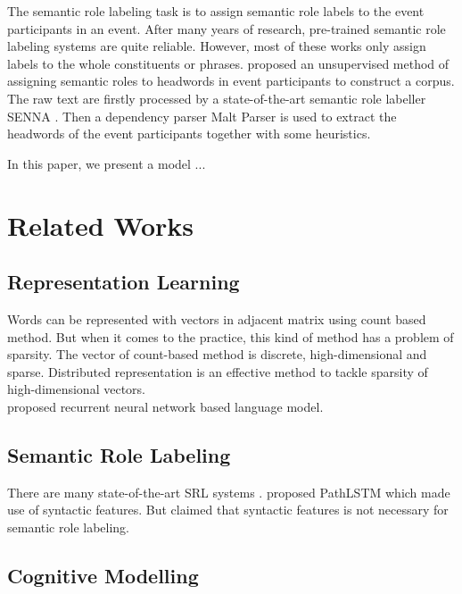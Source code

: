 \documentclass[a4paper]{article}
\begin{document}
\noindent
The semantic role labeling task is to assign semantic role labels to the event participants in an event. After many years of research, pre-trained semantic role labeling systems are quite reliable. However, most of these works only assign labels to the whole constituents or phrases. \citet{Sayeed2014} proposed an unsupervised method of assigning semantic roles to headwords in event participants to construct a corpus. The raw text are firstly processed by a state-of-the-art semantic role labeller SENNA \citep{Collobert}. Then a dependency parser Malt Parser is used to extract the headwords of the event participants together with some heuristics.


\noindent
In this paper, we present a model ...



\section{Related Works}

\subsection{Representation Learning}

Words can be represented with vectors in adjacent matrix using count based method. But when it comes to the practice, this kind of method has a problem of sparsity. The vector of count-based method is discrete, high-dimensional and sparse. Distributed representation is an effective method to tackle sparsity of high-dimensional vectors. \\
\noindent
\citet{mikolov2013distributed} proposed recurrent neural network based language model.

\subsection{Semantic Role Labeling}
There are many state-of-the-art SRL systems \citep{collobert2011natural, titov2011bayesian}. \citet{roth2016neural} proposed PathLSTM which made use of syntactic features. But \citet{marcheggiani2017simple} claimed that syntactic features is not necessary for semantic role labeling.

\subsection{Cognitive Modelling}
\end{document}
